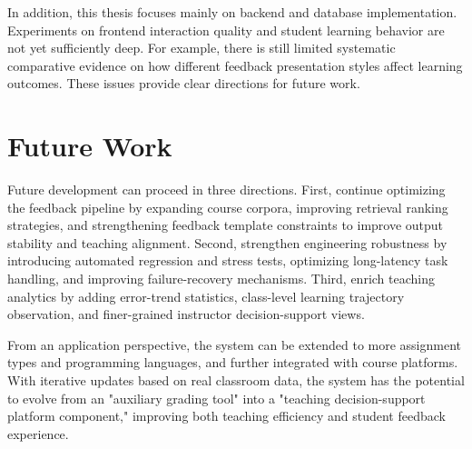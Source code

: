 In addition, this thesis focuses mainly on backend and database implementation. Experiments on frontend interaction quality and student learning behavior are not yet sufficiently deep. For example, there is still limited systematic comparative evidence on how different feedback presentation styles affect learning outcomes. These issues provide clear directions for future work.

\section{Future Work}

Future development can proceed in three directions. First, continue optimizing the feedback pipeline by expanding course corpora, improving retrieval ranking strategies, and strengthening feedback template constraints to improve output stability and teaching alignment. Second, strengthen engineering robustness by introducing automated regression and stress tests, optimizing long-latency task handling, and improving failure-recovery mechanisms. Third, enrich teaching analytics by adding error-trend statistics, class-level learning trajectory observation, and finer-grained instructor decision-support views.

From an application perspective, the system can be extended to more assignment types and programming languages, and further integrated with course platforms. With iterative updates based on real classroom data, the system has the potential to evolve from an "auxiliary grading tool" into a "teaching decision-support platform component," improving both teaching efficiency and student feedback experience.

